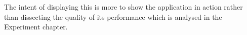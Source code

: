 The intent of displaying this is more to show the application in action rather than dissecting the quality of its performance which is analysed in the Experiment chapter.


